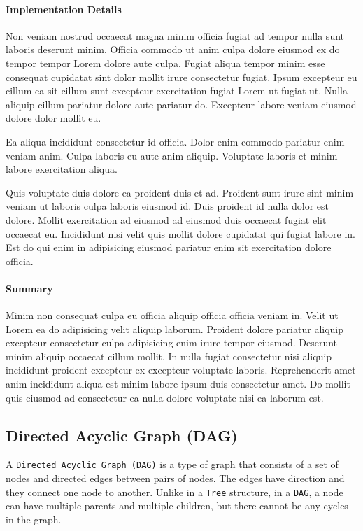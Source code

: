 \paragraph{Implementation Details}
Non veniam nostrud occaecat magna minim officia fugiat ad tempor nulla sunt laboris deserunt minim. Officia commodo ut anim culpa dolore eiusmod ex do tempor tempor Lorem dolore aute culpa. Fugiat aliqua tempor minim esse consequat cupidatat sint dolor mollit irure consectetur fugiat. Ipsum excepteur eu cillum ea sit cillum sunt excepteur exercitation fugiat Lorem ut fugiat ut. Nulla aliquip cillum pariatur dolore aute pariatur do. Excepteur labore veniam eiusmod dolore dolor mollit eu.

Ea aliqua incididunt consectetur id officia. Dolor enim commodo pariatur enim veniam anim. Culpa laboris eu aute anim aliquip. Voluptate laboris et minim labore exercitation aliqua.

Quis voluptate duis dolore ea proident duis et ad. Proident sunt irure sint minim veniam ut laboris culpa laboris eiusmod id. Duis proident id nulla dolor est dolore. Mollit exercitation ad eiusmod ad eiusmod duis occaecat fugiat elit occaecat eu. Incididunt nisi velit quis mollit dolore cupidatat qui fugiat labore in. Est do qui enim in adipisicing eiusmod pariatur enim sit exercitation dolore officia.

\paragraph{Summary}
Minim non consequat culpa eu officia aliquip officia officia veniam in. Velit ut Lorem ea do adipisicing velit aliquip laborum. Proident dolore pariatur aliquip excepteur consectetur culpa adipisicing enim irure tempor eiusmod. Deserunt minim aliquip occaecat cillum mollit. In nulla fugiat consectetur nisi aliquip incididunt proident excepteur ex excepteur voluptate laboris. Reprehenderit amet anim incididunt aliqua est minim labore ipsum duis consectetur amet. Do mollit quis eiusmod ad consectetur ea nulla dolore voluptate nisi ea laborum est.

\subsection{Directed Acyclic Graph (DAG)}
A \lstinline{Directed Acyclic Graph (DAG)} is a type of graph that consists of a set of nodes and directed edges between pairs of nodes. The edges have direction and they connect one node to another.
Unlike in a \lstinline{Tree} structure, in a \lstinline{DAG}, a node can have multiple parents and multiple children, but there cannot be any cycles in the graph.

